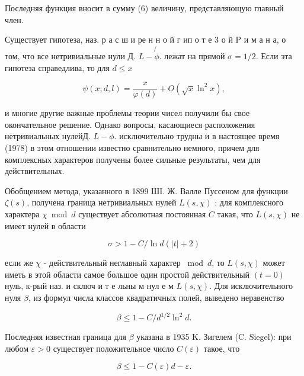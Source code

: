 \documentclass[10pt]{article}
\begin{document}
Последняя функция вносит в сумму (6) величину, представляющую главный член.



Существует гипотеза, наз. р а с ш и ре н н о й г ип о т е 3 о й $\mathrm{P}$ и м а н а, о том, что все нетривиальные нули Д. $L-\not{\phi}$. лежат на прямой $\sigma=1 / 2$. Если эта гипотеза справедлива, то для $d \leqslant x$



\[

\psi(x ; d, l)=\frac{x}{\varphi(d)}+O\left(\sqrt{x} \ln ^{2} x\right),

\]



и многие другие важные проблемы теории чисел получили бы свое окончательное решение. Однако вопросы, касающиеся расположения нетривиальных нулейД. $L-\phi$. исключительно трудны и в настоящее время (1978) в этом отношении известно сравнительно немного, причем для комплексных характеров получены более сильные результаты, чем для действительных.



Обобщением метода, указанного в 1899 ШI. Ж. Валле Пуссеном для функции $\zeta(s)$, получена граница нетривиальных нулей $L(s, \chi)$ : для комплексного характера $\chi \bmod d$ существует абсолютная постоянная $C$ такая, что $L(s, \chi)$ не имеет нулей в области



\[

\sigma>1-C / \ln d(|t|+2)

\]



если же $\chi$ - действительный неглавный характер $\bmod d$, то $L(s, \chi)$ может иметь в этой области самое большое один простой действительный $(t=0)$ нуль, к-рый наз. и сключ и т е льны м нул е м $L(s, \chi)$. Для исключительного нуля $\beta$, из формул числа классов квадратичных полей, выведено неравенство



\[

\beta \leqslant 1-C / d^{1 / 2} \ln ^{2} d .

\]



Последняя известная граница для $\beta$ указана в 1935 K. Зигелем (C. Siegel): при любом $\varepsilon>0$ существует положительное число $C(\varepsilon)$ такое, что



\[

\beta \leqslant 1-C(\varepsilon) d-\varepsilon .

\]
\end{document}
